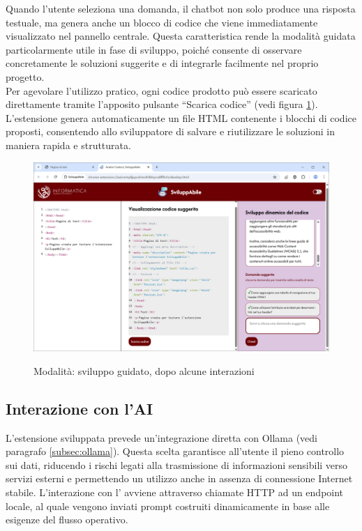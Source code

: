 \noindent Quando l’utente seleziona una domanda, il chatbot non solo produce una risposta testuale, ma genera anche un blocco di codice che viene immediatamente visualizzato nel pannello centrale. Questa caratteristica rende la modalità guidata particolarmente utile in fase di sviluppo, poiché consente di osservare concretamente le soluzioni suggerite e di integrarle facilmente nel proprio progetto.\\
Per agevolare l’utilizzo pratico, ogni codice prodotto può essere scaricato direttamente tramite l’apposito pulsante “Scarica codice” (vedi figura \ref{fig:mg2}). L’estensione genera automaticamente un file HTML contenente i blocchi di codice proposti, consentendo allo sviluppatore di salvare e riutilizzare le soluzioni in maniera rapida e strutturata.

\begin{figure}[H]
    \centering
    \includegraphics[width=1\linewidth, alt={Modalità di sviluppo guidato, dopo un'interazione}]{img/mg2.png}
    \caption{Modalità: sviluppo guidato, dopo alcune interazioni}\label{fig:mg2}
\end{figure}

\subsection{Interazione con l'AI}
\noindent L’estensione sviluppata prevede un’integrazione diretta con Ollama (vedi paragrafo \ref{subsec:ollama}). Questa scelta garantisce all’utente il pieno controllo sui dati, riducendo i rischi legati alla trasmissione di informazioni sensibili verso servizi esterni e permettendo un utilizzo anche in assenza di connessione Internet stabile. L’interazione con l’ avviene attraverso chiamate HTTP ad un endpoint locale, al quale vengono inviati prompt costruiti dinamicamente in base alle esigenze del flusso operativo.

